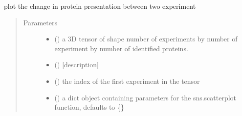 \documentclass[letterpaper,10pt,english]{sphinxmanual}
\begin{document}
\begin{fulllineitems}
\label{\detokenize{IPTK.Visualization:IPTK.Visualization.vizTools.plot_change_in_presentation_between_experiment}}
plot the change in protein presentation between two experiment
\begin{quote}\begin{description}
\item[{Parameters}] \leavevmode\begin{itemize}
\item {} 
 () \textendash{} a 3D tensor of shape number of experiments by number of experiment by number of identified proteins.

\item {} 
 () \textendash{} {[}description{]}

\item {} 
 () \textendash{} the index of the first experiment in the tensor

\item {} 
 (\sphinxstyleliteralemphasis{\sphinxupquote{{[}}}\sphinxstyleliteralemphasis{\sphinxupquote{,}}\sphinxstyleliteralemphasis{\sphinxupquote{{]}}}\sphinxstyleliteralemphasis{\sphinxupquote{, }}) \textendash{} a dict object containing parameters for the sns.scatterplot function, defaults to \{\}


\end{itemize}
\end{description}
\end{quote}
\end{fulllineitems}
\end{document}
